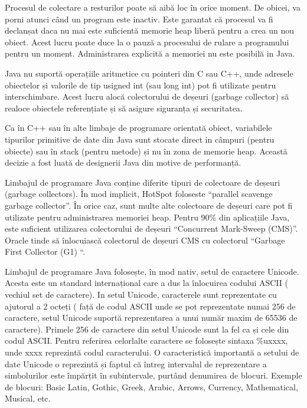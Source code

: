 \documentclass[12pt]{book}
\begin{document}
Procesul de colectare a resturilor poate să aibă loc în orice moment. De obicei, va porni atunci când un program este inactiv. Este garantat că procesul va fi declanșat daca nu mai este suficientă memorie heap liberă pentru a crea un nou obiect. Acest lucru poate duce la o pauză a procesului de rulare a programului pentru un moment. Administrarea explicită a memoriei nu este posibilă in Java.

Java nu suportă operațiile aritmetice cu pointeri din C sau C++, unde adresele obiectelor și valorile de tip usigned int (sau long int) pot fi utilizate pentru interschimbare. Acest lucru alocă colectorului de deșeuri (garbage collector) să realoce obiectele referențiate și să asigure siguranța și securitatea.

Ca în C++ sau în alte limbaje de programare orientată obiect, variabilele tipurilor primitive de date din Java sunt stocate direct in câmpuri (pentru obiecte) sau în stack (pentru metode) și nu în zona de memorie heap. Această decizie a fost luată de designerii Java din motive de performanță.

Limbajul de programare Java conține diferite tipuri de colectoare de deșeuri (garbage collectors). În mod implicit, HotSpot foloseste “parallel scavenge garbage collector”. În orice caz, sunt multe alte colectoare de deșeuri care pot fi utilizate pentru administrarea memoriei heap. Pentru 90\%  din aplicațiile Java, este suficient utilizarea colectorului de deșeuri “Concurrent Mark-Sweep (CMS)”. Oracle tinde să înlocuiască colectorul de deșeuri CMS cu colectorul “Garbage First Collector (G1) “.

Limbajul de programare Java folosește, în mod nativ, setul de caractere Unicode. Acesta este un standard internațional care a dus la înlocuirea codului ASCII ( vechiul set de caractere). In setul Unicode, caracterele sunt reprezentate cu ajutorul a 2 octeți ( față de codul ASCII unde se pot reprezentate numai 256 de caractere, setul Unicode suportă reprezentarea a unui număr maxim de 65536 de caractere). Primele 256 de caractere din setul Unicode sunt la fel ca și cele din codul ASCII. Pentru referirea celorlalte caractere se folosește sintaxa \%uxxxx, unde xxxx reprezintă codul caracterului. O caracteristică importantă a setului de date Unicode o reprezintă și faptul că întreg intervalul de reprezentare a simbolurilor este împărțit în subintervale, purtând denumirea de blocuri. Exemple de blocuri: Basic Latin, Gothic, Greek, Arabic, Arrows, Currency, Mathematical, Musical, etc. 
\end{document}
